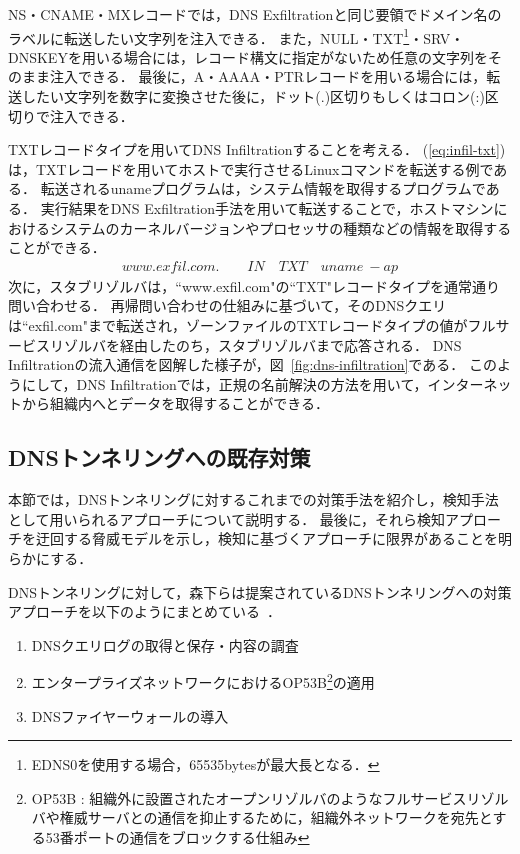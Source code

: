 
NS・CNAME・MXレコードでは，DNS Exfiltrationと同じ要領でドメイン名のラベルに転送したい文字列を注入できる．
また，NULL・TXT\footnote{EDNS0を使用する場合，65535bytesが最大長となる．}・SRV・DNSKEYを用いる場合には，レコード構文に指定がないため任意の文字列をそのまま注入できる．
最後に，A・AAAA・PTRレコードを用いる場合には，転送したい文字列を数字に変換させた後に，ドット(.)区切りもしくはコロン(:)区切りで注入できる．

TXTレコードタイプを用いてDNS Infiltrationすることを考える．
(\ref{eq:infil-txt})は，TXTレコードを用いてホストで実行させるLinuxコマンドを転送する例である．
転送されるunameプログラムは，システム情報を取得するプログラムである．
実行結果をDNS Exfiltration手法を用いて転送することで，ホストマシンにおけるシステムのカーネルバージョンやプロセッサの種類などの情報を取得することができる．
\begin{eqnarray}
 www.exfil.com. \qquad IN \quad TXT \quad uname \ -ap
 \label{eq:infil-txt}
\end{eqnarray}
次に，スタブリゾルバは，``www.exfil.com"の``TXT"レコードタイプを通常通り問い合わせる．
再帰問い合わせの仕組みに基づいて，そのDNSクエリは``exfil.com"まで転送され，ゾーンファイルのTXTレコードタイプの値がフルサービスリゾルバを経由したのち，スタブリゾルバまで応答される．
DNS Infiltrationの流入通信を図解した様子が，図~\ref{fig:dns-infiltration}である．
このようにして，DNS Infiltrationでは，正規の名前解決の方法を用いて，インターネットから組織内へとデータを取得することができる．


\newpage
\subsection{DNSトンネリングへの既存対策}

本節では，DNSトンネリングに対するこれまでの対策手法を紹介し，検知手法として用いられるアプローチについて説明する．
最後に，それら検知アプローチを迂回する脅威モデルを示し，検知に基づくアプローチに限界があることを明らかにする．

DNSトンネリングに対して，森下らは提案されているDNSトンネリングへの対策アプローチを以下のようにまとめている~\cite{morishita}．
\begin{enumerate}
 \item DNSクエリログの取得と保存・内容の調査
 \vspace{-0.5cm}
 \item エンタープライズネットワークにおけるOP53B\footnote{OP53B : 組織外に設置されたオープンリゾルバのようなフルサービスリゾルバや権威サーバとの通信を抑止するために，組織外ネットワークを宛先とする53番ポートの通信をブロックする仕組み}の適用
 \vspace{-0.5cm}
 \item DNSファイヤーウォールの導入
\end{enumerate}


